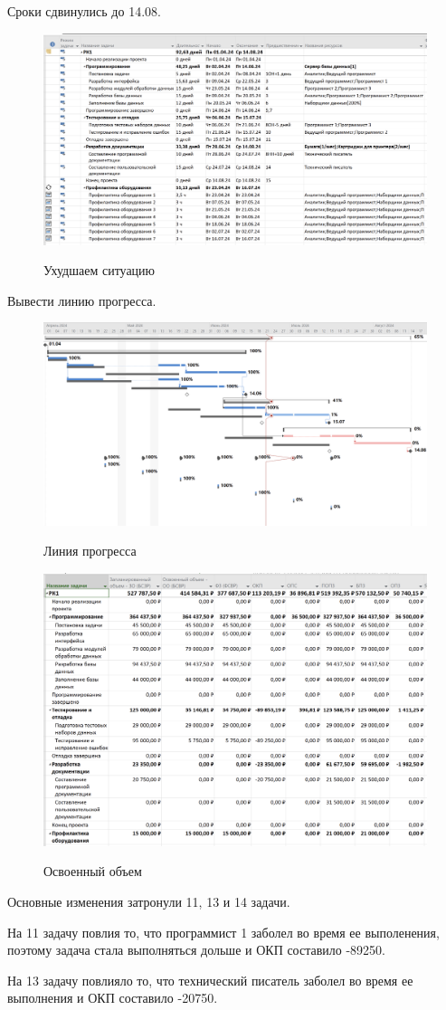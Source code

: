 Сроки сдвинулись до 14.08.

\begin{figure}[ht!]
	\includegraphics[width=0.75\linewidth]{assets/images/10.5.2-pisaka.png}
	\label{fig:r2}
	\caption{Ухудшаем ситуацию}
\end{figure}
\FloatBarrier

Вывести линию прогресса.

\begin{figure}[ht!]
	\includegraphics[width=0.75\linewidth]{assets/images/10.5-progress.png}
	\label{fig:r2}
	\caption{Линия прогресса}
\end{figure}
\FloatBarrier


\begin{figure}[ht!]
	\includegraphics[width=0.75\linewidth]{assets/images/10.6-dengi.png}
	\label{fig:r2}
	\caption{Освоенный объем}
\end{figure}
\FloatBarrier

Основные изменения затронули 11, 13 и 14 задачи.

На 11 задачу повлия то, что программист 1 заболел во время ее выполенения, поэтому задача стала выполняться дольше и ОКП составило -89250.

На 13 задачу повлияло то, что технический писатель заболел во время ее выполнения и ОКП составило -20750.
